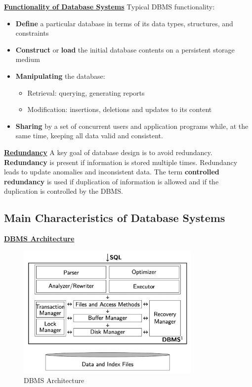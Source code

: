\textbf{\underline{Functionality of Database Systems}}
\bigskip
Typical DBMS functionality:
\begin{itemize}
    \item \textbf{Define} a particular database in terms of its data types, structures, and constraints
    \item \textbf{Construct} or \textbf{load} the initial database contents on a persistent storage medium
    \item \textbf{Manipulating} the database:
    \begin{itemize}
        \item Retrieval: querying, generating reports
        \item Modification: insertions, deletions and updates to its content
    \end{itemize}
    \item \textbf{Sharing} by a set of concurrent users and application programs while, at the same time, keeping all data valid and consistent.
\end{itemize}

\textbf{\underline{Redundancy}}
\bigskip
A key goal of database design is to avoid redundancy. \textbf{Redundancy} is present if information is stored multiple times. Redundancy leads to update anomalies and inconsistent data. The term \textbf{controlled redundancy} is used if duplication of information is allowed and if the duplication is controlled by the DBMS.

\subsection{Main Characteristics of Database Systems}

\textbf{\underline{DBMS Architecture}}

\begin{figure}[H]
\centering
\includegraphics[width=0.8\textwidth]{images/Screenshot 2024-05-01 at 17.25.40.jpg}
\caption{DBMS Architecture}
\end{figure}

